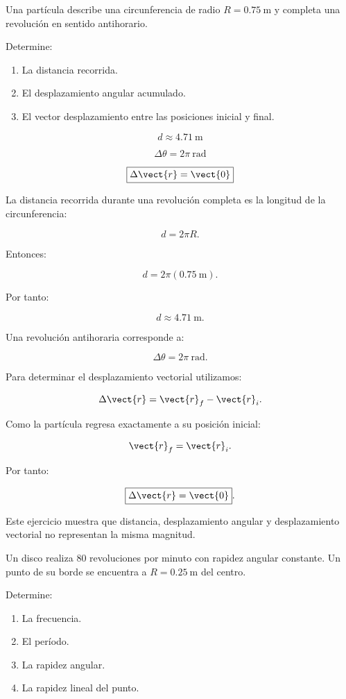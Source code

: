\begin{ejercicio}
Una partícula describe una circunferencia de radio
\(R=\SI{0.75}{\meter}\) y completa una revolución en sentido
antihorario.

Determine:

\begin{enumerate}[label=\alph*)]
    \item La distancia recorrida.
    \item El desplazamiento angular acumulado.
    \item El vector desplazamiento entre las posiciones inicial y final.
\end{enumerate}
\end{ejercicio}

\begin{respuesta}
\[
\boxed{d\approx\SI{4.71}{\meter}}
\]

\[
\boxed{\Delta\theta=2\pi\ \si{\radian}}
\]

\[
\boxed{\Delta\vect{r}=\vect{0}}
\]
\end{respuesta}

\begin{explicacion}
La distancia recorrida durante una revolución completa es la
longitud de la circunferencia:

\[
d=2\pi R.
\]

Entonces:

\[
d=2\pi(\SI{0.75}{\meter}).
\]

Por tanto:

\[
\boxed{d\approx\SI{4.71}{\meter}}.
\]

Una revolución antihoraria corresponde a:

\[
\boxed{\Delta\theta=2\pi\ \si{\radian}}.
\]

Para determinar el desplazamiento vectorial utilizamos:

\[
\Delta\vect{r}=\vect{r}_f-\vect{r}_i.
\]

Como la partícula regresa exactamente a su posición inicial:

\[
\vect{r}_f=\vect{r}_i.
\]

Por tanto:

\[
\boxed{\Delta\vect{r}=\vect{0}}.
\]

Este ejercicio muestra que distancia, desplazamiento angular y
desplazamiento vectorial no representan la misma magnitud.
\end{explicacion}


\begin{ejercicio}
Un disco realiza \(80\) revoluciones por minuto con rapidez
angular constante. Un punto de su borde se encuentra a
\(R=\SI{0.25}{\meter}\) del centro.

Determine:

\begin{enumerate}[label=\alph*)]
    \item La frecuencia.
    \item El período.
    \item La rapidez angular.
    \item La rapidez lineal del punto.
\end{enumerate}
\end{ejercicio}

